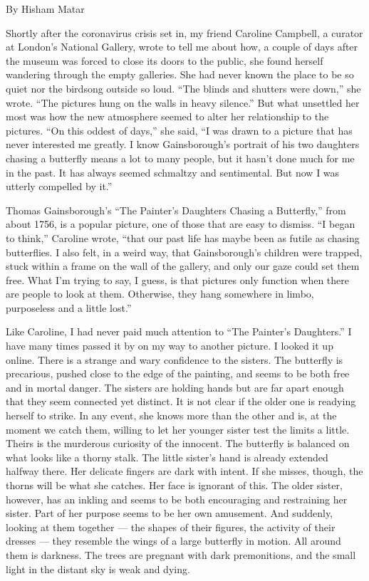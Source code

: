 By Hisham Matar

Shortly after the coronavirus crisis set in, my friend Caroline
Campbell, a curator at London's National Gallery, wrote to tell me about
how, a couple of days after the museum was forced to close its doors to
the public, she found herself wandering through the empty galleries. She
had never known the place to be so quiet nor the birdsong outside so
loud. ``The blinds and shutters were down,'' she wrote. ``The pictures
hung on the walls in heavy silence.'' But what unsettled her most was
how the new atmosphere seemed to alter her relationship to the pictures.
``On this oddest of days,'' she said, ``I was drawn to a picture that
has never interested me greatly. I know Gainsborough's portrait of his
two daughters chasing a butterfly means a lot to many people, but it
hasn't done much for me in the past. It has always seemed schmaltzy and
sentimental. But now I was utterly compelled by it.''

Thomas Gainsborough's ``The Painter's Daughters Chasing a Butterfly,''
from about 1756, is a popular picture, one of those that are easy to
dismiss. ``I began to think,'' Caroline wrote, ``that our past life has
maybe been as futile as chasing butterflies. I also felt, in a weird
way, that Gainsborough's children were trapped, stuck within a frame on
the wall of the gallery, and only our gaze could set them free. What I'm
trying to say, I guess, is that pictures only function when there are
people to look at them. Otherwise, they hang somewhere in limbo,
purposeless and a little lost.''

Like Caroline, I had never paid much attention to ``The Painter's
Daughters.'' I have many times passed it by on my way to another
picture. I looked it up online. There is a strange and wary confidence
to the sisters. The butterfly is precarious, pushed close to the edge of
the painting, and seems to be both free and in mortal danger. The
sisters are holding hands but are far apart enough that they seem
connected yet distinct. It is not clear if the older one is readying
herself to strike. In any event, she knows more than the other and is,
at the moment we catch them, willing to let her younger sister test the
limits a little. Theirs is the murderous curiosity of the innocent. The
butterfly is balanced on what looks like a thorny stalk. The little
sister's hand is already extended halfway there. Her delicate fingers
are dark with intent. If she misses, though, the thorns will be what she
catches. Her face is ignorant of this. The older sister, however, has an
inkling and seems to be both encouraging and restraining her sister.
Part of her purpose seems to be her own amusement. And suddenly, looking
at them together --- the shapes of their figures, the activity of their
dresses --- they resemble the wings of a large butterfly in motion. All
around them is darkness. The trees are pregnant with dark premonitions,
and the small light in the distant sky is weak and dying.

